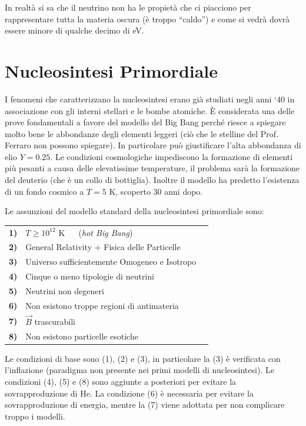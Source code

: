 In realtà si sa che il neutrino non ha le propietà che ci piacciono per rappresentare tutta la materia oscura (è troppo ``caldo'') e come si vedrà dovrà essere minore di qualche decimo di eV. 


\section{Nucleosintesi Primordiale}
I fenomeni che caratterizzano la nucleosintesi erano già studiati negli anni `40 in associazione con gli interni stellari e le bombe atomiche. È considerata una delle prove fondamentali a favore del modello del Big Bang perché riesce a spiegare molto bene le abbondanze degli elementi leggeri (ciò che le stelline del Prof. Ferraro non possono spiegare). In particolare può giustificare l'alta abbondanza di elio $Y=0.25$. Le condizioni cosmologiche impediscono la formazione di elementi più pesanti a causa delle elevatissime temperature, il problema sarà la formazione del deuterio (che è un collo di bottiglia). Inoltre il modello ha predetto l'esistenza di un fondo cosmico a $T=5$ K, scoperto 30 anni dopo. 

\vspace{1em}
\noindent Le assunzioni del modello standard della nucleosintesi primordiale sono:


\begin{table}[ht]
    \def\arraystretch{1.5}
    \begin{tabular}{lll}

    \textbf{1)} & $T\ge 10^{12}$ K $\quad$  (\textit{hot Big Bang}) \\
    \textbf{2)} & General Relativity $+$ Fisica delle Particelle \\
    \textbf{3)} & Universo sufficientemente Omogeneo e Isotropo  \\
    \textbf{4)} & Cinque o meno tipologie di neutrini \\
    \textbf{5)} & Neutrini non degeneri \\
    \textbf{6)} & Non esistono troppe regioni di antimateria \\
    \textbf{7)} & $\vec{B}$ trascurabili  \\
    \textbf{8)} & Non esistono particelle esotiche \\
    \end{tabular}
    \end{table}

Le condizioni di base sono (1), (2) e (3), in particolare la (3) è verificata con l'inflazione (paradigma non presente nei primi modelli di nucleosintesi). Le condizioni (4), (5) e (8) sono aggiunte a posteriori per evitare la sovrapproduzione di He. La condizione (6) è necessaria per evitare la sovrapproduzione di energia, mentre la (7) viene adottata per non complicare troppo i modelli.  

